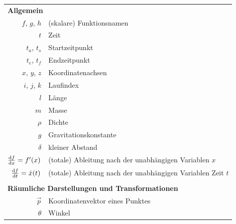 	\begin{table}
		\centering
		\begin{tabular}{rl}
			\multicolumn{2}{l}{\textbf{Allgemein}}                                                                       \\
			                         \(f\), \(g\), \(h\) & (skalare) Funktionsnamen                                      \\
			                                       \(t\) & Zeit                                                          \\
			                            \(t_a\), \(t_s\) & Startzeitpunkt                                                \\
			                            \(t_e\), \(t_f\) & Endzeitpunkt                                                  \\
			                         \(x\), \(y\), \(z\) & Koordinatenachsen                                             \\
			                         \(i\), \(j\), \(k\) & Laufindex                                                     \\
			                                       \(l\) & Länge                                                         \\
			                                       \(m\) & Masse                                                         \\
			                                    \(\rho\) & Dichte                                                        \\
			                                       \(g\) & Gravitationskonstante                                         \\
			                                  \(\delta\) & kleiner Abstand                                               \\
			     \( \dv{f}{x} = f'(x) \) & (totale) Ableitung nach der unabhängigen Variablen \(x\)      \\
			\( \dv{f}{t} = \dot{x}(t) \) & (totale) Ableitung nach der unabhängigen Variablen Zeit \(t\) \\&\\
		\multicolumn{2}{l}{\textbf{Räumliche Darstellungen und Transformationen}} \\
			                \(\vec{p}\) & Koordinatenvektor eines Punktes \\
			                 \(\theta\) & Winkel                          \\

\end{tabular}
\end{table}
